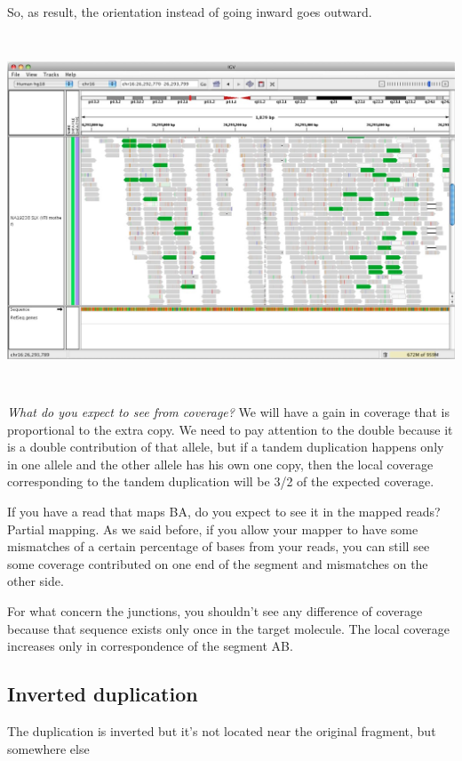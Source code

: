 So, as result, the orientation instead of going inward goes outward.

\includegraphics[width=6.22598in,height=4.14375in]{image24.jpeg}

\emph{What do you expect to see from coverage?} We will have a gain in coverage
that is proportional to the extra copy. We need to pay attention to the double
because it is a double contribution of that allele, but if a tandem duplication
happens only in one allele and the other allele has his own one copy, then the
local coverage corresponding to the tandem duplication will be 3/2 of the
expected coverage.

If you have a read that maps BA, do you expect to see it in the mapped reads?
Partial mapping. As we said before, if you allow your mapper to have some
mismatches of a certain percentage of bases from your reads, you can still see
some coverage contributed on one end of the segment and mismatches on the other
side.

For what concern the junctions, you shouldn't see any difference of coverage
because that sequence exists only once in the target molecule. The local
coverage increases only in correspondence of the segment AB.


\hypertarget{inverted-duplication}{%
\subsection{Inverted duplication}\label{inverted-duplication}}


The duplication is inverted but it's not located near the original fragment, but
somewhere else

